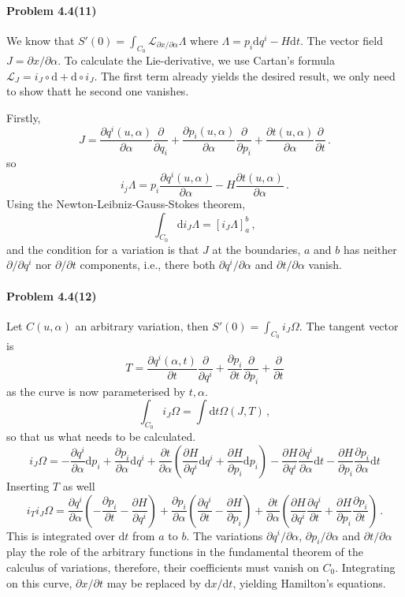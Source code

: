 \documentclass[a4paper,12pt]{article}
\def\d{\mathrm{d}}
\newcommand{\problem}[1]{\paragraph{Problem #1}}
\begin{document}
\problem{4.4(11)} We know that $S'(0) = \int_{C_0}\mathcal{L}_{\partial x/\partial \alpha}\Lambda$ where $\Lambda = p_i \d q^i - H \d t$. The vector field $J=\partial x /\partial \alpha$. To calculate the Lie-derivative, we use Cartan's formula $\mathcal{L}_J = i_J \circ \d + \d \circ i_J$. The first term already yields the desired result, we only need to show thatt he second one vanishes.

Firstly,
\[
J = \frac{\partial q^i(u, \alpha)}{\partial \alpha} \frac{\partial}{\partial q_i} + \frac{\partial p_i(u, \alpha)}{\partial \alpha}\frac{\partial}{\partial p_i} + \frac{\partial t(u, \alpha)}{\partial \alpha}\frac{\partial}{\partial t}\,.
\]
so
\[
 i_j \Lambda = p_i\frac{\partial q^i(u, \alpha)}{\partial \alpha} - H \frac{\partial t(u, \alpha)}{\partial \alpha}\,.
\]
Using the Newton-Leibniz-Gauss-Stokes theorem,
\[
 \int_{C_0} \d i_J \Lambda = \left[ i_J \Lambda \right]_a^b\,,
\]
and the condition for a variation is that $J$ at the boundaries, $a$ and $b$ has neither $\partial/\partial q^i$ nor $\partial/\partial t$ components, i.e., there both $\partial q^i/\partial \alpha$ and $\partial t/\partial \alpha$ vanish.


\problem{4.4(12)} Let $C(u, \alpha)$ an arbitrary variation, then $S'(0) = \int_{C_0} i_J \Omega$. The tangent vector is
\[
 T = \frac{\partial q^i(\alpha, t)}{\partial t} \frac{\partial}{\partial q^i} + \frac{\partial p_i}{\partial t}\frac{\partial}{\partial p_i}+\frac{\partial}{\partial t}
\]
as the curve is now parameterised by $t, \alpha$.
\[
 \int_{C_0} i_J \Omega = \int \d t \Omega(J, T)\,,
\]
so that us what needs to be calculated.
\[
 i_J \Omega = -\frac{\partial q^i}{\partial\alpha}\d p_i + \frac{\partial p_i}{\partial \alpha }\d q^i + \frac{\partial t}{\partial \alpha}\left(\frac{\partial H}{\partial q^i}\d q^i + \frac{\partial H}{\partial p_i}\d p_i\right) - \frac{\partial H}{\partial q^i}\frac{\partial q^i}{\partial \alpha}\d t - \frac{\partial H}{\partial p_i}\frac{\partial p_i}{\partial \alpha}\d t
\]
Inserting $T$ as well
\[
 i_T i_J \Omega = \frac{\partial q^i}{\partial \alpha}\left( -\frac{\partial p_i}{\partial t} - \frac{\partial H}{\partial q^i}\right) + \frac{\partial p_i}{\partial \alpha}\left(\frac{\partial q^i}{\partial t}-\frac{\partial H}{\partial p_i}\right) + \frac{\partial t}{\partial \alpha}\left( \frac{\partial H}{\partial q^i}\frac{\partial q^i}{\partial t} + \frac{\partial H}{\partial p_i}\frac{\partial p_i}{\partial t}\right)\,.
\]
This is integrated over $\d t$ from $a$ to $b$. The variations $\partial q^i/\partial \alpha$, $\partial p_i/\partial\alpha$ and $\partial t/\partial \alpha$ play the role of the arbitrary functions in the fundamental theorem of the calculus of variations, therefore, their coefficients must vanish on $C_0$. Integrating on this curve, $\partial x/ \partial t$ may be replaced by $\d x/\d t$, yielding Hamilton's equations.
\end{document}
